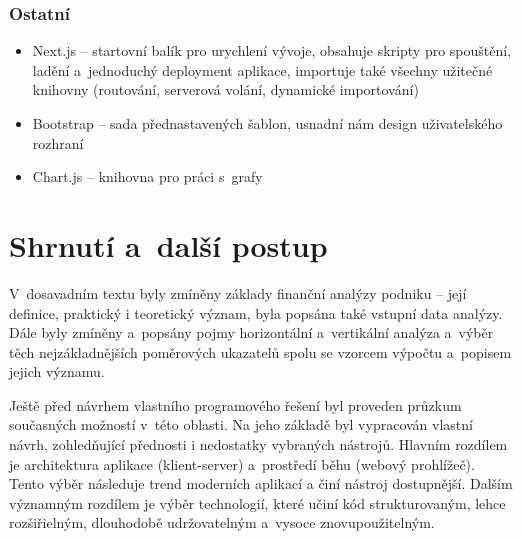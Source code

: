 \subsubsection{Ostatní}
\begin{itemize}
	\item Next.js -- startovní balík pro urychlení vývoje, obsahuje skripty pro spouštění, ladění a~jednoduchý deployment aplikace, importuje také všechny užitečné knihovny (routování, serverová volání, dynamické importování)
	\item Bootstrap -- sada přednastavených šablon, usnadní nám design uživatelského rozhraní
	\item Chart.js -- knihovna pro práci s~grafy
\end{itemize} 






\section{Shrnutí a~další postup}
V~dosavadním textu byly zmíněny základy finanční analýzy podniku -- její definice, praktický i teoretický význam, byla popsána také vstupní data analýzy. Dále byly zmíněny a~popsány pojmy horizontální a~vertikální analýza a~výběr těch nejzákladnějších poměrových ukazatelů spolu se vzorcem výpočtu a~popisem jejich významu. 

Ještě před návrhem vlastního programového řešení byl proveden průzkum současných možností v~této oblasti. Na jeho základě byl vypracován vlastní návrh, zohledňující přednosti i nedostatky vybraných nástrojů. Hlavním rozdílem je architektura aplikace (klient-server) a~prostředí běhu (webový prohlížeč). Tento výběr následuje trend moderních aplikací a činí nástroj dostupnější. Dalším významným rozdílem je výběr technologií, které učiní kód strukturovaným, lehce rozšiřielným, dlouhodobě udržovatelným a~vysoce znovupoužitelným. 

